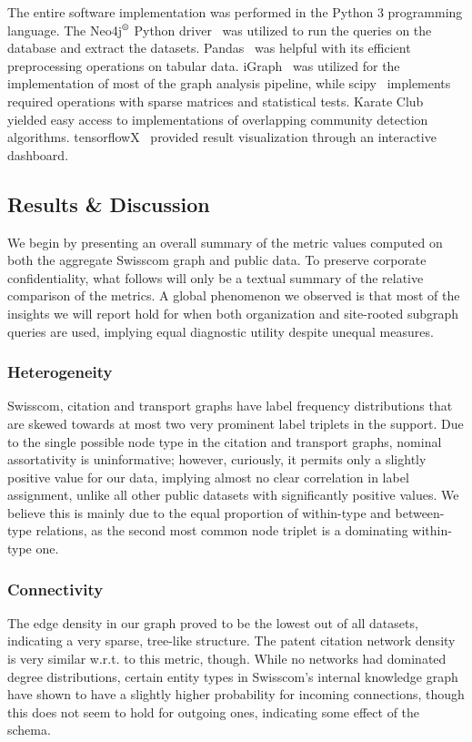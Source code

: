 The entire software implementation was performed in the Python 3 programming language. The Neo4j$\textsuperscript{\textregistered}$ Python driver~\cite{neo4j_inc_neo4j_2022} was utilized to run the queries on the database and extract the datasets. Pandas~\cite{mckinney_data_2010} was helpful with its efficient preprocessing operations on tabular data. iGraph~\cite{csardi_igraph_2005} was utilized for the implementation of most of the graph analysis pipeline, while scipy~\cite{virtanen_scipy_2020} implements required operations with sparse matrices and statistical tests. Karate Club~\cite{rozemberczki_karate_2020} yielded easy access to implementations of overlapping community detection algorithms. tensorflowX~\cite{huang_tensorboardx_2022} provided result visualization through an interactive dashboard.

\subsection{Results \& Discussion}
\label{sec:results_swisscom}

We begin by presenting an overall summary of the metric values computed on both the aggregate Swisscom graph and public data. To preserve corporate confidentiality, what follows will only be a textual summary of the relative comparison of the metrics. A global phenomenon we observed is that most of the insights we will report hold for when both organization and site-rooted subgraph queries are used, implying equal diagnostic utility despite unequal measures. 

\subsubsection{Heterogeneity} 
Swisscom, citation and transport graphs have label frequency distributions that are skewed towards at most two very prominent label triplets in the support. Due to the single possible node type in the citation and transport graphs, nominal assortativity is uninformative; however, curiously, it permits only a slightly positive value for our data, implying almost no clear correlation in label assignment, unlike all other public datasets with significantly positive values. We believe this is mainly due to the equal proportion of within-type and between-type relations, as the second most common node triplet is a dominating within-type one.

\subsubsection{Connectivity} 
The edge density in our graph proved to be the lowest out of all datasets, indicating a very sparse, tree-like structure. The patent citation network density is very similar w.r.t. to this metric, though. While no networks had dominated degree distributions, certain entity types in Swisscom's internal knowledge graph have shown to have a slightly higher probability for incoming connections, though this does not seem to hold for outgoing ones, indicating some effect of the schema. 

